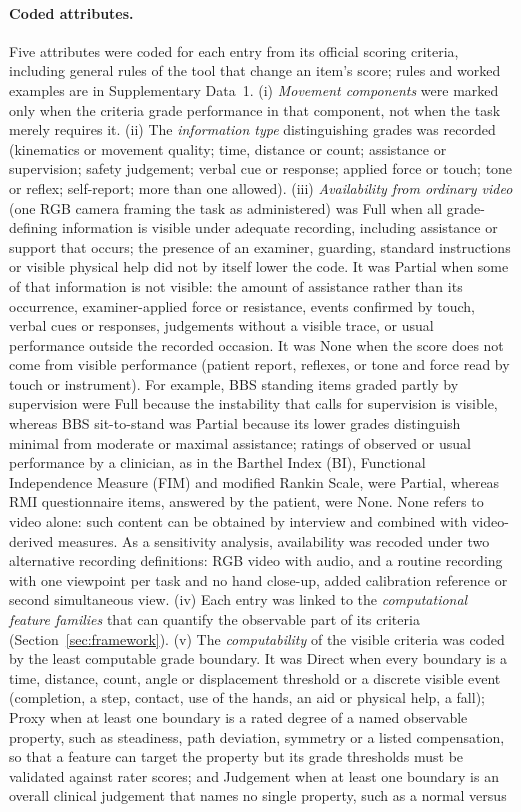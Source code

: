 \documentclass[11pt]{article}
\begin{document}
\paragraph{Coded attributes.} Five attributes were coded for each entry from its official scoring criteria, including general rules of the tool that change an item's score; rules and worked examples are in Supplementary Data~1. (i) \emph{Movement components} were marked only when the criteria grade performance in that component, not when the task merely requires it. (ii) The \emph{information type} distinguishing grades was recorded (kinematics or movement quality; time, distance or count; assistance or supervision; safety judgement; verbal cue or response; applied force or touch; tone or reflex; self-report; more than one allowed). (iii) \emph{Availability from ordinary video} (one RGB camera framing the task as administered) was Full when all grade-defining information is visible under adequate recording, including assistance or support that occurs; the presence of an examiner, guarding, standard instructions or visible physical help did not by itself lower the code. It was Partial when some of that information is not visible: the amount of assistance rather than its occurrence, examiner-applied force or resistance, events confirmed by touch, verbal cues or responses, judgements without a visible trace, or usual performance outside the recorded occasion. It was None when the score does not come from visible performance (patient report, reflexes, or tone and force read by touch or instrument). For example, BBS standing items graded partly by supervision were Full because the instability that calls for supervision is visible, whereas BBS sit-to-stand was Partial because its lower grades distinguish minimal from moderate or maximal assistance; ratings of observed or usual performance by a clinician, as in the Barthel Index (BI), Functional Independence Measure (FIM) and modified Rankin Scale, were Partial, whereas RMI questionnaire items, answered by the patient, were None. None refers to video alone: such content can be obtained by interview and combined with video-derived measures. As a sensitivity analysis, availability was recoded under two alternative recording definitions: RGB video with audio, and a routine recording with one viewpoint per task and no hand close-up, added calibration reference or second simultaneous view. (iv) Each entry was linked to the \emph{computational feature families} that can quantify the observable part of its criteria (Section~\ref{sec:framework}). (v) The \emph{computability} of the visible criteria was coded by the least computable grade boundary. It was Direct when every boundary is a time, distance, count, angle or displacement threshold or a discrete visible event (completion, a step, contact, use of the hands, an aid or physical help, a fall); Proxy when at least one boundary is a rated degree of a named observable property, such as steadiness, path deviation, symmetry or a listed compensation, so that a feature can target the property but its grade thresholds must be validated against rater scores; and Judgement when at least one boundary is an overall clinical judgement that names no single property, such as a normal versus 
\end{document}

